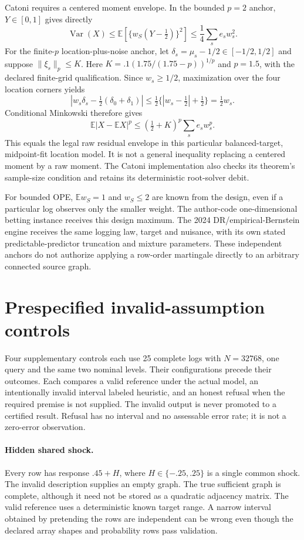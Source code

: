 Catoni requires a centered moment envelope. In the bounded $p=2$ anchor,
$Y\in[0,1]$ gives directly
\[
 \operatorname{Var}(X)\leq
 \mathbb E\!\left[\{w_S(Y-\tfrac 12)\}^2\right]
 \leq\frac 14\sum_s e_sw_s^2.
\]
For the finite-$p$ location-plus-noise anchor, let
$\delta_s=\mu_s-1/2\in[-1/2,1/2]$ and suppose
$\|\xi_s\|_p\leq K$. Here
$K=.1(1.75/(1.75-p))^{1/p}$ and $p=1.5$, with the declared finite-grid
qualification. Since $w_s\geq 1/2$, maximization over the four location
corners yields
\[
 \left|w_s\delta_s-\tfrac 12(\delta_0+\delta_1)\right|
 \leq\tfrac 12\{|w_s-\tfrac 12|+\tfrac 12\}
 =\tfrac 12w_s.
\]
Conditional Minkowski therefore gives
\[
 \mathbb E|X-\mathbb EX|^p
 \leq(\tfrac 12+K)^p\sum_s e_sw_s^p.
\]
This equals the legal raw residual envelope in this particular balanced-target,
midpoint-fit location model. It is not a general inequality replacing a
centered moment by a raw moment. The Catoni implementation also checks its
theorem's sample-size condition and retains its deterministic root-solver
debit.

For bounded OPE, $\mathbb Ew_S=1$ and $w_S\leq 2$ are known from the design,
even if a particular log observes only the smaller weight. The author-code
one-dimensional betting instance receives this design maximum. The 2024
DR/empirical-Bernstein engine receives the same logging law, target and
nuisance, with its own stated predictable-predictor truncation and mixture
parameters. These independent anchors do not authorize applying a row-order
martingale directly to an arbitrary connected source graph.

\section{Prespecified invalid-assumption controls}
\label{app:post-negative-controls}

Four supplementary controls each use 25 complete logs with $N=32768$, one
query and the same two nominal levels. Their configurations precede their
outcomes. Each compares a valid reference under the actual model, an
intentionally invalid interval labeled heuristic, and an honest refusal when
the required premise is not supplied. The invalid output is never promoted
to a certified result. Refusal has no interval and no assessable error rate;
it is not a zero-error observation.

\paragraph{Hidden shared shock.}
Every row has response $.45+H$, where $H\in\{-.25,.25\}$ is a single common
shock. The invalid description supplies an empty graph. The true sufficient
graph is complete, although it need not be stored as a quadratic adjacency
matrix. The valid reference uses a deterministic known target range. A narrow
interval obtained by pretending the rows are independent can be wrong even
though the declared array shapes and probability rows pass validation.

